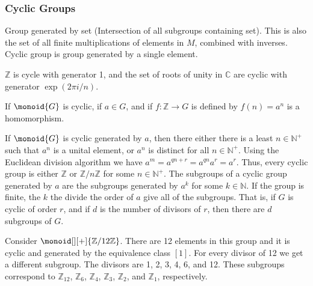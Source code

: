 \documentclass{article}                                                        %
\begin{document}
            \subsubsection{Cyclic Groups}
                Group generated by set (Intersection of all subgroups
                containing set). This is also the set of all finite
                multiplications of elements in $M$, combined with inverses.
                Cyclic group is group generated by a single element.
                \begin{example}
                    $\mathbb{Z}$ is cycle with generator 1, and the set of roots
                    of unity in $\mathbb{C}$ are cyclic with generator
                    $\exp(2\pi{i}/n)$.
                \end{example}
                \begin{theorem}
                    If $\monoid{G}$ is cyclic, if $a\in{G}$, and if
                    $f:\mathbb{Z}\rightarrow{G}$ is defined by $f(n)=a^{n}$ is
                    a homomorphism.
                \end{theorem}
                If $\monoid{G}$ is cyclic generated by $a$, then there either
                there is a least $n\in\mathbb{N}^{+}$ such that $a^{n}$ is a
                unital element, or $a^{n}$ is distinct for all
                $n\in\mathbb{N}^{+}$. Using the Euclidean division algorithm we
                have $a^{m}=a^{qn+r}=a^{qn}a^{r}=a^{r}$. Thus, every cyclic
                group is either $\mathbb{Z}$ or $\mathbb{Z}/n\mathbb{Z}$ for
                some $n\in\mathbb{N}^{+}$. The subgroups of a cyclic group
                generated by $a$ are the subgroups generated by $a^{k}$ for some
                $k\in\mathbb{N}$. If the group is finite, the $k$ the divide
                the order of $a$ give all of the subgroups. That is, if
                $G$ is cyclic of order $r$, and if $d$ is the number of divisors
                of $r$, then there are $d$ subgroups of $G$.
                \begin{example}
                    Consider $\monoid[][+]{\mathbb{Z}/12\mathbb{Z}}$. There are
                    12 elements in this group and it is cyclic and generated by
                    the equivalence class $[1]$. For every divisor of 12 we get
                    a different subgroup. The divisors are 1, 2, 3, 4, 6, and
                    12. These subgroups correspond to $\mathbb{Z}_{12}$,
                    $\mathbb{Z}_{6}$, $\mathbb{Z}_{4}$, $\mathbb{Z}_{3}$,
                    $\mathbb{Z}_{2}$, and $\mathbb{Z}_{1}$, respectively.
                \end{example}
\end{document}
